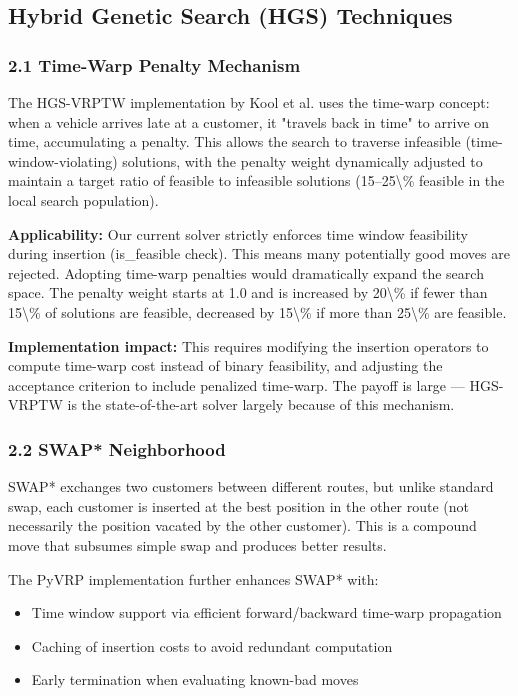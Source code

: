 \documentclass[twocolumn,10pt,letterpaper]{article}
\begin{document}
\subsection{Hybrid Genetic Search (HGS) Techniques}

\subsubsection{2.1 Time-Warp Penalty Mechanism}

The HGS-VRPTW implementation by Kool et al. uses the time-warp concept: when a vehicle arrives late at a customer, it "travels back in time" to arrive on time, accumulating a penalty. This allows the search to traverse infeasible (time-window-violating) solutions, with the penalty weight dynamically adjusted to maintain a target ratio of feasible to infeasible solutions (15--25\textbackslash{}\% feasible in the local search population).


\textbf{Applicability:} Our current solver strictly enforces time window feasibility during insertion (is\_feasible check). This means many potentially good moves are rejected. Adopting time-warp penalties would dramatically expand the search space. The penalty weight starts at 1.0 and is increased by 20\textbackslash{}\% if fewer than 15\textbackslash{}\% of solutions are feasible, decreased by 15\textbackslash{}\% if more than 25\textbackslash{}\% are feasible.


\textbf{Implementation impact:} This requires modifying the insertion operators to compute time-warp cost instead of binary feasibility, and adjusting the acceptance criterion to include penalized time-warp. The payoff is large --- HGS-VRPTW is the state-of-the-art solver largely because of this mechanism.


\subsubsection{2.2 SWAP* Neighborhood}

SWAP* exchanges two customers between different routes, but unlike standard swap, each customer is inserted at the best position in the other route (not necessarily the position vacated by the other customer). This is a compound move that subsumes simple swap and produces better results.


The PyVRP implementation further enhances SWAP* with:

\begin{itemize}
\setlength{\itemsep}{0pt}
\setlength{\parskip}{0pt}
  \item Time window support via efficient forward/backward time-warp propagation
  \item Caching of insertion costs to avoid redundant computation
  \item Early termination when evaluating known-bad moves
\end{itemize}
\end{document}
